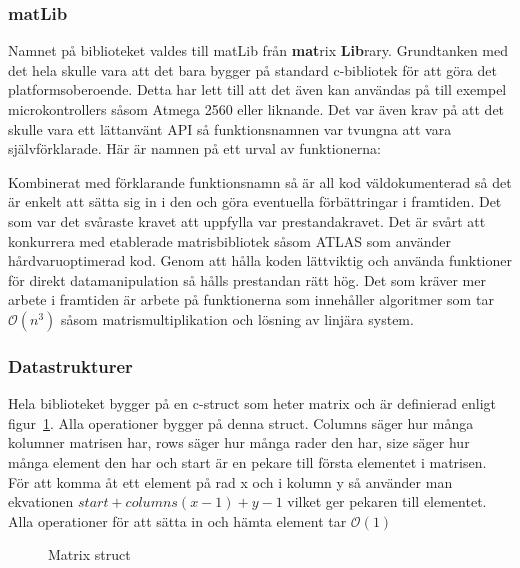 \subsubsection{matLib}
Namnet på biblioteket valdes till matLib från \textbf{mat}rix \textbf{Lib}rary. Grundtanken med det hela skulle vara att det bara bygger på standard c-bibliotek för att göra det platformsoberoende. Detta har lett till att det även kan användas på till exempel microkontrollers såsom Atmega 2560 eller liknande.
Det var även krav på att det skulle vara ett lättanvänt API så funktionsnamnen var tvungna att vara självförklarade. Här är namnen på ett urval av funktionerna:

Kombinerat med förklarande funktionsnamn så är all kod väldokumenterad så det är enkelt att sätta sig in i den och göra eventuella förbättringar i framtiden.
\newline
\newline
Det som var det svåraste kravet att uppfylla var prestandakravet. Det är svårt att konkurrera med etablerade matrisbibliotek såsom ATLAS som använder hårdvaruoptimerad kod. Genom att hålla koden lättviktig och använda funktioner för direkt datamanipulation så hålls prestandan rätt hög. Det som kräver mer arbete i framtiden är arbete på funktionerna som innehåller algoritmer som tar $\mathcal{O}(n^3)$ såsom matrismultiplikation och lösning av linjära system.



\subsubsection{Datastrukturer}
Hela biblioteket bygger på en c-struct som heter matrix och är definierad enligt figur~\ref{fig:matrix_struct}. Alla operationer bygger på denna struct. Columns säger hur många kolumner matrisen har, rows säger hur många rader den har, size säger hur många element den har och start är en pekare till första elementet i matrisen. För att komma åt ett element på rad x och i kolumn y så använder man ekvationen $start+columns(x-1)+y-1$ vilket ger pekaren till elementet. Alla operationer för att sätta in och hämta element tar $\mathcal{O}(1)$
\begin{figure}[H]

\caption{Matrix struct}
\label{fig:matrix_struct}
\end{figure}

